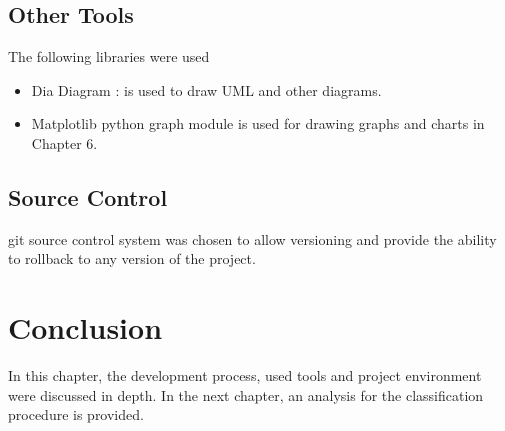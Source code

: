 \subsection{Other Tools}
The following libraries were used
\begin{itemize}
  \item Dia Diagram : is used to draw UML and other diagrams.
  \item Matplotlib python graph module is used for drawing graphs and charts in Chapter 6.
\end{itemize}

\subsection{Source Control}
git source control system \cite{GIT} was chosen to allow versioning and provide 
the ability to rollback to any version of the project.
\section{Conclusion}
In this chapter, the development process, used tools and project environment were 
discussed in depth. In the next chapter, an analysis for the classification 
procedure is provided.

